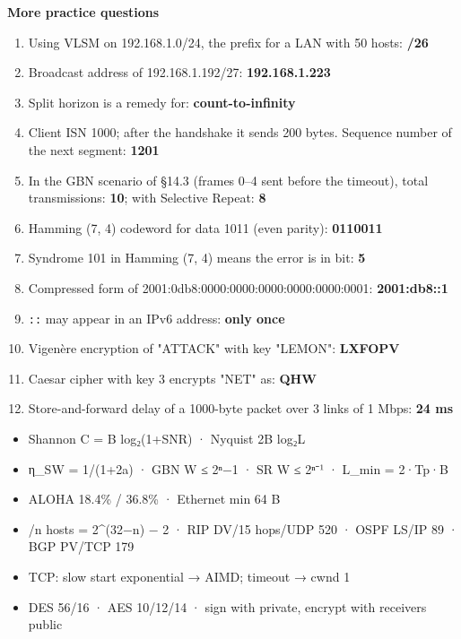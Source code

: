 \textbf{More practice questions}

\begin{enumerate}
\def\labelenumi{\arabic{enumi}.}
\setcounter{enumi}{68}
\tightlist
\item
  Using VLSM on 192.168.1.0/24, the prefix for a LAN with 50 hosts: \textbf{/26}
\item
  Broadcast address of 192.168.1.192/27: \textbf{192.168.1.223}
\item
  Split horizon is a remedy for: \textbf{count-to-infinity}
\item
  Client ISN 1000; after the handshake it sends 200 bytes. Sequence number of the next segment: \textbf{1201}
\item
  In the GBN scenario of §14.3 (frames 0--4 sent before the timeout), total transmissions: \textbf{10}; with Selective Repeat: \textbf{8}
\item
  Hamming (7, 4) codeword for data 1011 (even parity): \textbf{0110011}
\item
  Syndrome 101 in Hamming (7, 4) means the error is in bit: \textbf{5}
\item
  Compressed form of 2001:0db8:0000:0000:0000:0000:0000:0001: \textbf{2001:db8::1}
\item
  \texttt{::} may appear in an IPv6 address: \textbf{only once}
\item
  Vigenère encryption of "ATTACK" with key "LEMON": \textbf{LXFOPV}
\item
  Caesar cipher with key 3 encrypts "NET" as: \textbf{QHW}
\item
  Store-and-forward delay of a 1000-byte packet over 3 links of 1 Mbps: \textbf{24 ms}
\end{enumerate}

\begin{revbox}

\begin{itemize}
\tightlist
\item
  Shannon C = B log₂(1+SNR) · Nyquist 2B log₂L
\item
  η\_SW = 1/(1+2a) · GBN W ≤ 2ⁿ−1 · SR W ≤ 2ⁿ⁻¹ · L\_min = 2·Tp·B
\item
  ALOHA 18.4\% / 36.8\% · Ethernet min 64 B
\item
  /n hosts = 2\^{}(32−n) − 2 · RIP DV/15 hops/UDP 520 · OSPF LS/IP 89 · BGP PV/TCP 179
\item
  TCP: slow start exponential → AIMD; timeout → cwnd 1
\item
  DES 56/16 · AES 10/12/14 · sign with private, encrypt with receiver\textquotesingle s public
\end{itemize}

\end{revbox}
